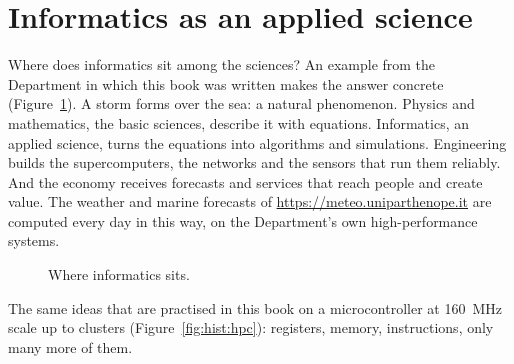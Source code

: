 \section{Informatics as an applied science}

Where does informatics sit among the sciences? An example from the
Department in which this book was written makes the answer concrete
(Figure~\ref{fig:hist:chain}). A storm forms over the sea: a natural
phenomenon. Physics and mathematics, the basic sciences, describe it with
equations. Informatics, an applied science, turns the equations into
algorithms and simulations. Engineering builds the supercomputers, the
networks and the sensors that run them reliably. And the economy receives
forecasts and services that reach people and create value. The weather and
marine forecasts of \url{https://meteo.uniparthenope.it} are computed every
day in this way, on the Department's own high-performance systems.

\begin{figure}[htb]
\centering
{}
\caption{Where informatics sits.}
\label{fig:hist:chain}
\end{figure}

The same ideas that are practised in this book on a microcontroller at
160~MHz scale up to clusters (Figure~\ref{fig:hist:hpc}): registers, memory,
instructions, only many more of them.

